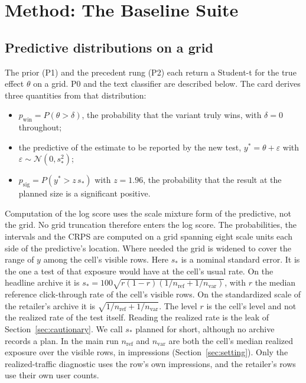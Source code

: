 \documentclass[sigconf,nonacm]{acmart}
\newcommand{\pwin}{p_{\mathrm{win}}}
\newcommand{\psig}{p_{\mathrm{sig}}}
\begin{document}
\section{Method: The Baseline Suite}
\label{sec:method}

\subsection{Predictive distributions on a grid}
The prior (P1) and the precedent rung (P2) each return a Student-t for the true effect $\theta$ on a grid. P0 and the text classifier are described below. The card derives three quantities from that distribution:
\begin{itemize}
\item $\pwin = P(\theta > \delta)$, the probability that the variant truly wins, with $\delta = 0$ throughout;
\item the predictive of the estimate to be reported by the new test, $y^\ast = \theta + \varepsilon$ with $\varepsilon \sim \mathcal{N}(0, s_\ast^2)$;
\item $\psig = P(y^\ast > z\, s_\ast)$ with $z = 1.96$, the probability that the result at the planned size is a significant positive.
\end{itemize}
Computation of the log score uses the scale mixture form of the predictive, not the grid. No grid truncation therefore enters the log score. The probabilities, the intervals and the CRPS are computed on a grid spanning eight scale units each side of the predictive's location. Where needed the grid is widened to cover the range of $y$ among the cell's visible rows. Here $s_\ast$ is a nominal standard error. It is the one a test of that exposure would have at the cell's usual rate. On the headline archive it is $s_\ast = 100\sqrt{r(1-r)(1/n_{\mathrm{ref}} + 1/n_{\mathrm{var}})}$, with $r$ the median reference click-through rate of the cell's visible rows. On the standardized scale of the retailer's archive it is $\sqrt{1/n_{\mathrm{ref}} + 1/n_{\mathrm{var}}}$. The level $r$ is the cell's level and not the realized rate of the test itself. Reading the realized rate is the leak of Section~\ref{sec:cautionary}. We call $s_\ast$ planned for short, although no archive records a plan. In the main run $n_{\mathrm{ref}}$ and $n_{\mathrm{var}}$ are both the cell's median realized exposure over the visible rows, in impressions (Section~\ref{sec:setting}). Only the realized-traffic diagnostic uses the row's own impressions, and the retailer's rows use their own user counts.
\end{document}
